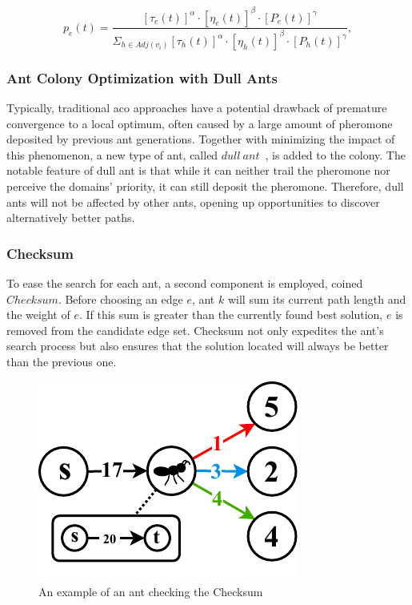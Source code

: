 \begin{equation}
	\label{equation:edge_pick}
	p_e(t) = 
	\frac{[\tau_e(t)]^{\alpha} \cdot [\eta_e(t)]^{\beta} \cdot  [P_e(t)]^{\gamma}}{\Sigma_{h \in Adj(v_i)} [\tau_h(t)]^{\alpha} \cdot [\eta_h(t)]^{\beta} \cdot [P_h(t)]^{\gamma}},
\end{equation}

\subsubsection{Ant Colony Optimization with Dull Ants}
Typically, traditional \gls{aco} approaches have a potential drawback of premature convergence to a local optimum, often caused by a large amount of pheromone deposited by previous ant generations. Together with minimizing the impact of this phenomenon, a new type of ant, called $dull~ant$~\cite{shimomura2010ant}, is added to the colony. The notable feature of dull ant is that while it can neither trail the pheromone nor perceive the domains' priority, it can still deposit the pheromone. Therefore, dull ants will not be affected by other ants, opening up opportunities to discover alternatively better paths.

\subsubsection{Checksum}
To ease the search for each ant, a second component is employed, coined $Checksum$. Before choosing an edge $e$, ant $k$ will sum its current path length and the weight of $e$. If this sum is greater than the currently found best solution, $e$ is removed from the candidate edge set. Checksum not only expedites the ant's search process but also ensures that the solution located will always be better than the previous one.

\setlength{\intextsep}{3pt}
\renewcommand{\scalefigure}{1.1}
\begin{figure}[htbp]
	\centering
	\includegraphics[scale=\scalefigure]{Figures/chap 3/CheckSum.pdf}
	\caption{An example of an ant checking the Checksum}
	\label{fig:checksum}
\end{figure}

